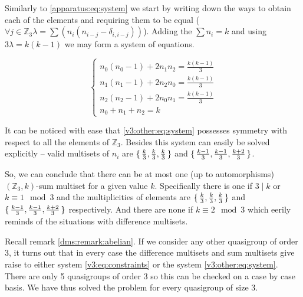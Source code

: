     Similarly to \eqref{apparatus:eq:system} we start by writing down the ways to obtain each of the elements and requiring them to be equal ($\forall j \in \mathbb Z_3 \lambda = \sum (n_i(n_{i-j}-\delta_{i,i-j}))$). Adding the $\sum n_i = k$ and using $3\lambda = k(k-1)$ we may form a system of equations.
    
    \begin{equation}
        \label{v3:other:eq:system}
        \begin{cases}
            n_0 (n_0-1) + 2 n_1 n_2 = \frac{k(k-1)}{3} \\
            n_1 (n_1-1) + 2 n_2 n_0 = \frac{k(k-1)}{3} \\
            n_2 (n_2-1) + 2 n_0 n_1 = \frac{k(k-1)}{3} \\
            n_0 + n_1 + n_2 = k
        \end{cases}
    \end{equation}

    It can be noticed with ease that \eqref{v3:other:eq:system} possesses symmetry with respect to all the elements of $\mathbb Z_3$. Besides this system can easily be solved explicitly -- valid multisets of $n_i$ are $\set{\frac k 3, \frac k 3, \frac k 3}$ and $\set{\frac{k-1}{3}, \frac{k-1}{3}, \frac{k+2}{3}}$.
    
    So, we can conclude that there can be at most one (up to automorphisms) $(\mathbb Z_3, k)$-sum multiset for a given value $k$. Specifically there is one if $3 \mid k$ or $k \equiv 1 \mod 3$ and the multiplicities of elements are $\set{\frac k 3, \frac k 3, \frac k 3}$ and $\set{\frac{k-1}{3}, \frac{k-1}{3}, \frac{k+2}{3}}$ respectively. And there are none if $k \equiv 2 \mod 3$ which eerily reminds of the situations with difference multisets.
    
    Recall remark \ref{dms:remark:abelian}. If we consider any other quasigroup of order 3, it turns out that in every case the difference multisets and sum multisets give raise to either system \eqref{v3:eq:constraints} or the system \eqref{v3:other:eq:system}. There are only 5 quasigroups of order 3 so this can be checked on a case by case basis. We have thus solved the problem for every quasigroup of size 3.
    

